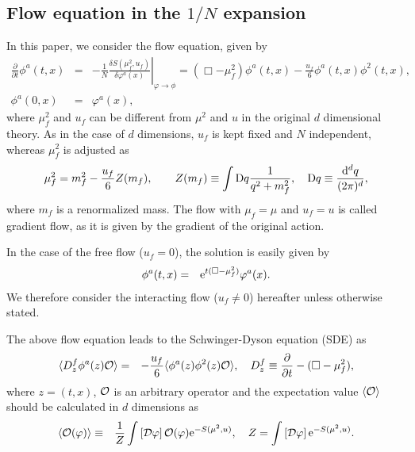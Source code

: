 \documentclass[preprint]{ptephy_v1}%
\newcommand{\rme}{{\rm e}}
\newcommand{\rmd}{{\rm d}}
\newcommand{\rmD}{{\rm D}}
\begin{document}
\subsection{Flow equation in the $1/N$ expansion }
In this paper, we consider the flow equation, given by
\begin{eqnarray}
\frac{\partial}{\partial t} \phi^a(t,x) &=& -\left. \frac{1}{N} \frac{\delta S(\mu_f^2,u_f)}{\delta \varphi^a(x)}\right\vert_{\varphi\rightarrow\phi}
= \left(\Box -\mu_f^2\right)\phi^a(t,x) -\frac{u_f}{6}\phi^a(t,x)
\phi^2(t,x), 
\label{eq:flow} \\
\phi^a(0,x) &=&\varphi^a(x), \nonumber
\end{eqnarray}
where $\mu_f^2$ and $u_f$ can be different from $\mu^2$ and $u$ in 
the original $d$ dimensional theory.
As in the case of $d$ dimensions,  $u_f$ is kept fixed and $N$ independent, whereas $\mu^2_f$ is adjusted as 
\begin{equation}
\mu_f^2 = m_f^2 - \frac{u_f}{6} Z(m_f), \qquad Z(m_f) \equiv \int \rmD q \frac{1}{q^2+m_f^2}, \quad \rmD q \equiv \frac{\rmd^d q}{(2\pi)^d},  
\label{eq:Zm}
\end{equation}
where $m_f$ is  a renormalized mass.
The flow with $\mu_f=\mu$ and $u_f=u$ is called gradient flow, as it is 
given by the gradient of the original action. 

In the case of the free flow ($u_f=0$), the solution is easily given by
\begin{eqnarray}
\phi^a(t,x) &=& \rme^{t(\Box -\mu_f^2)} \varphi^a(x).
\end{eqnarray}
We therefore consider the interacting flow ($u_f\not=0$) hereafter unless otherwise stated.

The above flow equation leads to the Schwinger-Dyson equation (SDE)\cite{Aoki:2014dxa}  as
\begin{eqnarray}
\langle D^f_z \phi^a(z) {\cal O} \rangle &=& -\frac{u_f}{6} \langle \phi^a(z) \phi^2(z) {\cal O}\rangle,  
\quad D_z^f \equiv \frac{\partial}{\partial t} -(\Box -\mu_f^2), 
\end{eqnarray}
where $z=(t,x)$, ${\cal O}$ is an arbitrary operator and the expectation value $\langle{\cal O} \rangle$ should be calculated in $d$  dimensions as
\begin{eqnarray}
\langle {\cal O}(\varphi)\rangle &\equiv & \frac{1}{Z} \int \left[{\cal D}\varphi\right] {\cal O}(\varphi)\rme^{-S(\mu^2,u)}, \quad
Z = \int \left[{\cal D}\varphi\right] \rme^{-S(\mu^2,u)} .
\label{eq:vev_d}
\end{eqnarray}
\end{document}
